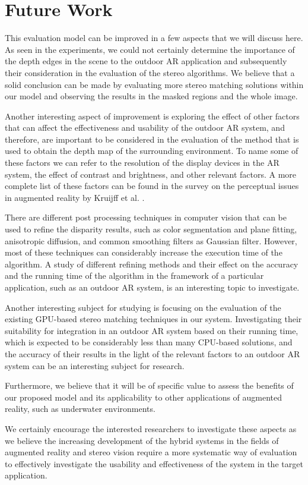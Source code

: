 \section{Future Work}
This evaluation model can be improved in a few aspects that we will discuss here.
As seen in the experiments, we could not certainly determine the importance of the depth edges in the scene to the outdoor AR application and subsequently their consideration in the evaluation 
of the stereo algorithms. We believe that a solid conclusion can be made by evaluating more stereo matching solutions
within our model and observing the results in the masked regions and the whole image.

Another interesting aspect of improvement is exploring the effect of other factors that can affect the effectiveness and usability of the outdoor AR system, and therefore, 
are important to be considered in the evaluation of the method that is used to obtain the depth map of the surrounding environment. To name some of these factors we can refer to
the resolution of the display devices in the AR system, the effect of contrast and brightness, and other relevant factors. A more complete list of these factors can be
found in the survey on the perceptual issues in augmented reality by Kruijff et al. \cite{kru10}.

There are different post processing techniques in computer vision that can be used to refine the disparity results, such as color segmentation and plane fitting, 
anisotropic diffusion, and common smoothing filters as Gaussian filter. However, most of these techniques can considerably increase the execution time of the algorithm.
A study of different refining methods and their effect on the accuracy and the running time of the algorithm in the framework of a particular application, 
such as an outdoor AR system, is an interesting topic to investigate.

Another interesting subject for studying is focusing on the evaluation of the existing GPU-based stereo matching techniques in our system.
Investigating their suitability for integration in an outdoor AR system based on their running time, which is expected to be considerably less than many CPU-based solutions, 
and the accuracy of their results in the light of the relevant factors to an outdoor AR system can be an interesting subject for research.

Furthermore, we believe that it will be of specific value to
assess the benefits of our proposed model and its applicability to other applications of augmented reality, such as underwater environments. 

We certainly encourage the 
interested researchers to investigate these aspects as we believe the increasing development of the hybrid systems in the fields of augmented reality and stereo vision 
require a more systematic way of evaluation to effectively investigate the usability and effectiveness of the system in the target application.



